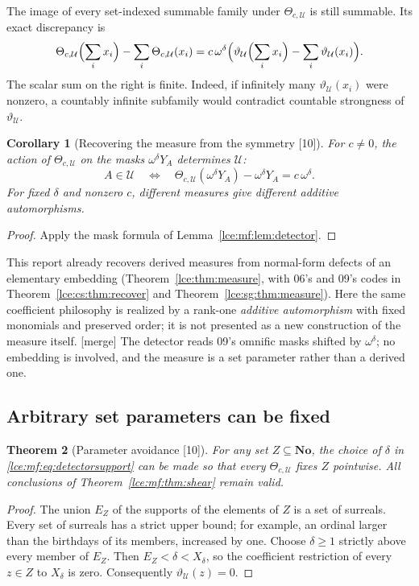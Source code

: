 \documentclass[11pt,letterpaper]{article}
\numberwithin{equation}{section}
\newtheorem{theorem}{Theorem}[section]
\newtheorem{corollary}[theorem]{Corollary}
\theoremstyle{definition}
\theoremstyle{remark}
\newcommand{\No}{\mathbf{No}}
\newcommand{\thref}[1]{Theorem~\ref{#1}}
\newcommand{\leref}[1]{Lemma~\ref{#1}}
\newcommand{\src}[1]{\textup{\textsf{\small[#1]}}}%
\newcommand{\mergetag}{\textup{\textsf{\small[merge]}}}%
\begin{document}
The image of every set-indexed summable family under $\Theta_{c,\mathcal U}$
is still summable. Its exact discrepancy is
\begin{equation}\label{lce:mf:eq:Adefect}
 \Theta_{c,\mathcal U}\Bigl(\sum_ix_i\Bigr)-\sum_i\Theta_{c,\mathcal U}(x_i)
 =c\,\omega^\delta\Bigl(\vartheta_{\mathcal U}\Bigl(\sum_ix_i\Bigr)
   -\sum_i\vartheta_{\mathcal U}(x_i)\Bigr).
\end{equation}
The scalar sum on the right is finite. Indeed, if infinitely many
$\vartheta_{\mathcal U}(x_i)$ were nonzero, a countably infinite subfamily
would contradict countable strongness of $\vartheta_{\mathcal U}$.

\begin{corollary}[Recovering the measure from the symmetry \src{10}]\label{lce:mf:cor:recover}
For $c\ne0$, the action of $\Theta_{c,\mathcal U}$ on the masks
$\omega^\delta Y_A$ determines $\mathcal U$:
\[
 A\in\mathcal U\quad\Longleftrightarrow\quad
 \Theta_{c,\mathcal U}(\omega^\delta Y_A)-\omega^\delta Y_A=c\,\omega^\delta.
\]
For fixed $\delta$ and nonzero $c$, different measures give different
additive automorphisms.
\end{corollary}
\begin{proof}
Apply the mask formula of \leref{lce:mf:lem:detector}.
\end{proof}

This report already recovers derived measures from normal-form defects of
an elementary embedding (\thref{lce:thm:measure}, with 06's and 09's codes
in \thref{lce:cs:thm:recover} and \thref{lce:sg:thm:measure}). Here the
same coefficient philosophy is realized by a rank-one \emph{additive
automorphism} with fixed monomials and preserved order; it is not presented
as a new construction of the measure itself. \mergetag{} The detector reads
09's omnific masks shifted by $\omega^\delta$; no embedding is involved, and
the measure is a set parameter rather than a derived one.

\subsection{Arbitrary set parameters can be fixed}
\begin{theorem}[Parameter avoidance \src{10}]\label{lce:mf:thm:parameters}
For any set $Z\subseteq\No$, the choice of $\delta$ in
\eqref{lce:mf:eq:detectorsupport} can be made so that every
$\Theta_{c,\mathcal U}$ fixes $Z$ pointwise. All conclusions of
\thref{lce:mf:thm:shear} remain valid.
\end{theorem}
\begin{proof}
The union $E_Z$ of the supports of the elements of $Z$ is a set of surreals.
Every set of surreals has a strict upper bound; for example, an ordinal
larger than the birthdays of its members, increased by one. Choose
$\delta\ge1$ strictly above every member of $E_Z$. Then
$E_Z<\delta<X_\delta$, so the coefficient restriction of every $z\in Z$ to
$X_\delta$ is zero. Consequently $\vartheta_{\mathcal U}(z)=0$.
\end{proof}
\end{document}

